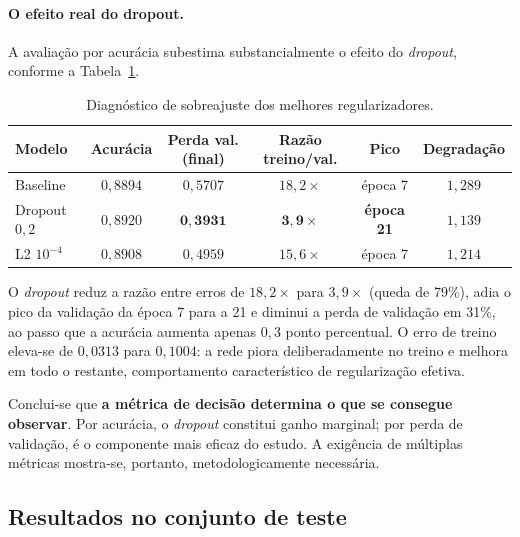 \documentclass[11pt,a4paper]{article}
\begin{document}
\paragraph{O efeito real do dropout.} A avaliação por acurácia subestima
substancialmente o efeito do \emph{dropout}, conforme a Tabela~\ref{tab:clf-diag}.

\begin{table}[htbp]
\centering
\caption{Diagnóstico de sobreajuste dos melhores regularizadores.}
\label{tab:clf-diag}
\begin{tabular}{lccccc}
\toprule
Modelo & Acurácia & Perda val. (final) & Razão treino/val. & Pico & Degradação \\
\midrule
Baseline & $0{,}8894$ & $0{,}5707$ & $18{,}2\times$ & época 7 & $1{,}289$ \\
Dropout $0{,}2$ & $0{,}8920$ & $\mathbf{0{,}3931}$ & $\mathbf{3{,}9\times}$ & \textbf{época 21} & $1{,}139$ \\
L2 $10^{-4}$ & $0{,}8908$ & $0{,}4959$ & $15{,}6\times$ & época 7 & $1{,}214$ \\
\bottomrule
\end{tabular}
\end{table}

O \emph{dropout} reduz a razão entre erros de $18{,}2\times$ para $3{,}9\times$ (queda de
79\%), adia o pico da validação da época 7 para a 21 e diminui a perda de validação em
31\%, ao passo que a acurácia aumenta apenas $0{,}3$ ponto percentual. O erro de treino
eleva-se de $0{,}0313$ para $0{,}1004$: a rede piora deliberadamente no treino e melhora
em todo o restante, comportamento característico de regularização efetiva.

Conclui-se que \textbf{a métrica de decisão determina o que se consegue observar}. Por
acurácia, o \emph{dropout} constitui ganho marginal; por perda de validação, é o
componente mais eficaz do estudo. A exigência de múltiplas métricas mostra-se, portanto,
metodologicamente necessária.

\subsection{Resultados no conjunto de teste}
\end{document}
